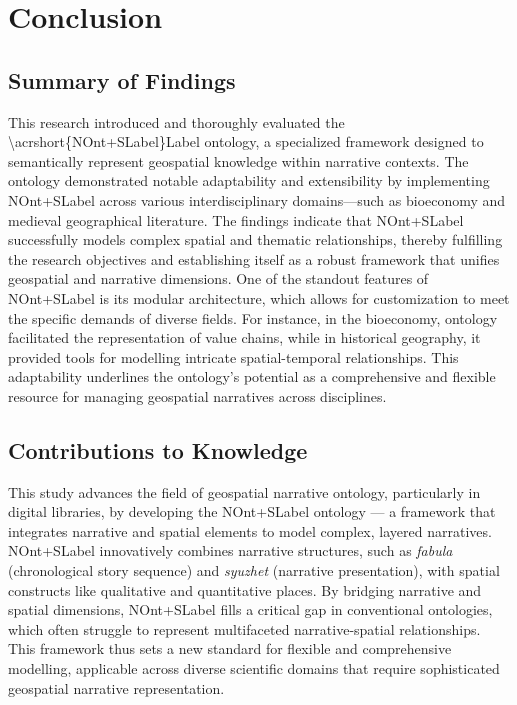 \chapter{Conclusion}\label{chap:conclusion}

\section{Summary of Findings}

This research introduced and thoroughly evaluated the \acrfull{\acrshort{NOnt+SLabel}Label} ontology, a specialized framework designed to semantically represent geospatial knowledge within narrative contexts. The ontology demonstrated notable adaptability and extensibility by implementing \acrshort{NOnt+SLabel} across various interdisciplinary domains—such as bioeconomy and medieval geographical literature. The findings indicate that \acrshort{NOnt+SLabel} successfully models complex spatial and thematic relationships, thereby fulfilling the research objectives and establishing itself as a robust framework that unifies geospatial and narrative dimensions. One of the standout features of \acrshort{NOnt+SLabel} is its modular architecture, which allows for customization to meet the specific demands of diverse fields. For instance, in the bioeconomy, ontology facilitated the representation of value chains, while in historical geography, it provided tools for modelling intricate spatial-temporal relationships. This adaptability underlines the ontology’s potential as a comprehensive and flexible resource for managing geospatial narratives across disciplines.

\section{Contributions to Knowledge}

This study advances the field of geospatial narrative ontology, particularly in digital libraries, by developing the \acrshort{NOnt+SLabel} ontology — a framework that integrates narrative and spatial elements to model complex, layered narratives. \acrshort{NOnt+SLabel} innovatively combines narrative structures, such as \textit{fabula} (chronological story sequence) and \textit{syuzhet} (narrative presentation), with spatial constructs like qualitative and quantitative places. By bridging narrative and spatial dimensions, \acrshort{NOnt+SLabel} fills a critical gap in conventional ontologies, which often struggle to represent multifaceted narrative-spatial relationships. This framework thus sets a new standard for flexible and comprehensive modelling, applicable across diverse scientific domains that require sophisticated geospatial narrative representation.

